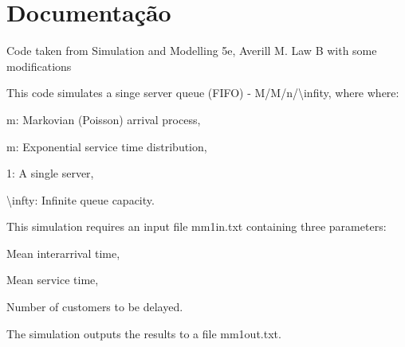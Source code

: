 \chapter{Documentação}
\hypertarget{index}{}\label{index}
Code taken from Simulation and Modelling 5e, Averill M. Law B with some modifications

This code simulates a singe server queue (FIFO) -\/ M/\+M/n/\textbackslash{}infity, where where\+:
\begin{DoxyItemize}
\item m\+: Markovian (Poisson) arrival process,
\item m\+: Exponential service time distribution,
\item 1\+: A single server,
\item \textbackslash{}infty\+: Infinite queue capacity.
\end{DoxyItemize}

This simulation requires an input file {\ttfamily mm1in.\+txt} containing three parameters\+:
\begin{DoxyEnumerate}
\item Mean interarrival time,
\item Mean service time,
\item Number of customers to be delayed.
\end{DoxyEnumerate}

The simulation outputs the results to a file {\ttfamily mm1out.\+txt}. 